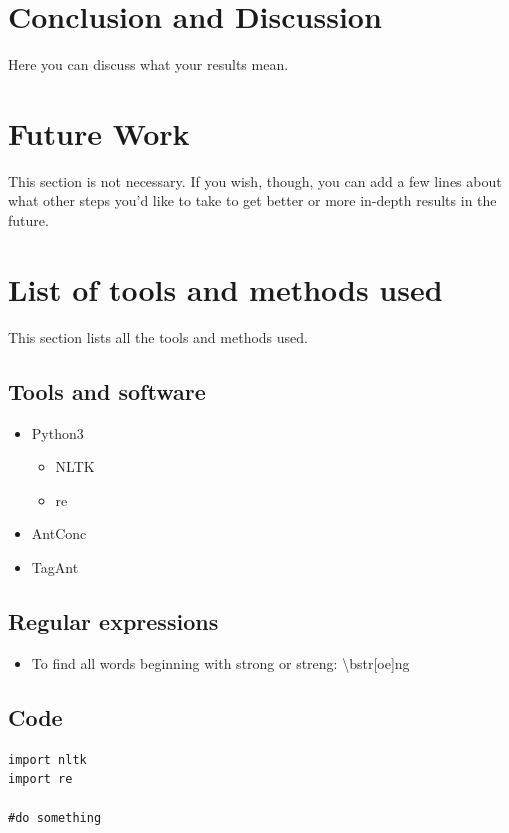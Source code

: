\documentclass[12pt]{article}
\begin{document}
\section{Conclusion and Discussion}
\label{Conlusion}
Here you can discuss what your results mean.

\section{Future Work}
\label{future}
This section is not necessary. If you wish, though, you can add a few lines about what other steps you'd like to take to get better or more in-depth results in the future.
\section{List of tools and methods used}
This section lists all the tools and methods used.
\subsection{Tools and software}
\begin{itemize}
\item Python3
\begin{itemize}
\item NLTK
\item re
\end{itemize}
\item AntConc
\item TagAnt
\end{itemize}
\subsection{Regular expressions}
\begin{itemize}
\item To find all words beginning with strong or streng: \textbackslash{b}str[oe]ng \end{itemize}
\subsection{Code}
\begin{lstlisting}
import nltk
import re

#do something
\end{lstlisting}

\end{document}
